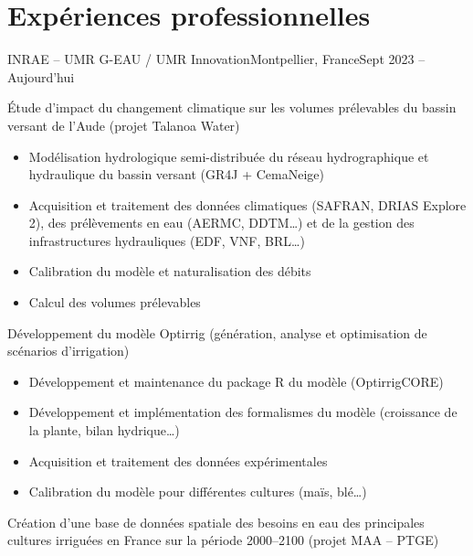 \documentclass[10pt, a4paper]{article}
\begin{document}
\section{Expériences professionnelles}
%
  {INRAE -- UMR G-EAU / UMR Innovation}{Montpellier, France}{Sept 2023 -- Aujourd'hui}
\begin{cvpoints}
  \item Étude d'impact du changement climatique sur les volumes prélevables du
  bassin versant de l'Aude (projet Talanoa Water)
  \begin{itemize}
    \item Modélisation hydrologique semi-distribuée du réseau hydrographique et
    hydraulique du bassin versant (GR4J + CemaNeige)
    \item Acquisition et traitement des données climatiques (SAFRAN, DRIAS
    Explore 2), des prélèvements en eau (AERMC, DDTM…) et de la gestion des
    infrastructures hydrauliques (EDF, VNF, BRL…)
    \item Calibration du modèle et naturalisation des débits
    \item Calcul des volumes prélevables
  \end{itemize}
  \item Développement du modèle Optirrig (génération, analyse et optimisation de
  scénarios d'irrigation)
  \begin{itemize}
    \item Développement et maintenance du package R du modèle (OptirrigCORE)
    \item Développement et implémentation des formalismes du modèle (croissance
    de la plante, bilan hydrique…)
    \item Acquisition et traitement des données expérimentales
    \item Calibration du modèle pour différentes cultures (maïs, blé…)
  \end{itemize}
  \item Création d'une base de données spatiale des besoins en eau des
  principales cultures irriguées en France sur la période 2000--2100 (projet
  MAA -- PTGE)
\end{cvpoints}
\end{document}
